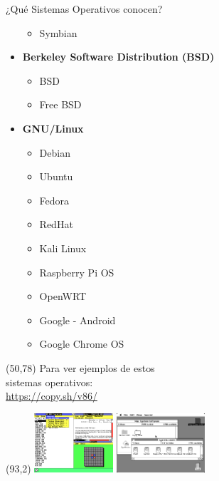 \documentclass[aspectratio=169]{beamer}
\begin{document}
\begin{frame}{¿Qué Sistemas Operativos conocen?}
\begin{textblock}{80}
\begin{itemize}
        \begin{itemize} \scriptsize 
            \item Symbian
        \end{itemize}
        \item[] \textbf{Berkeley Software Distribution (BSD)}
        \begin{itemize} \scriptsize 
            \item BSD
            \item Free BSD
        \end{itemize}
        \item[] \textbf{GNU/Linux}
        \begin{itemize} \scriptsize 
            \item Debian
            \item Ubuntu
            \item Fedora
            \item RedHat
            \item Kali Linux
            \item Raspberry Pi OS
            \item OpenWRT
            \item Google - Android 
            \item Google Chrome OS
        \end{itemize}
        \end{itemize}
    \end{textblock}
    \begin{textblock}{80}(50,78)
    \scriptsize
    Para ver ejemplos de estos\\
    sistemas operativos:\\
    \url{https://copy.sh/v86/}
    \end{textblock}
    \begin{textblock}{80}(93,2)  
    \includegraphics[height=2.2cm]{img/Microsoft_Windows_1.0_1985.png} \hspace{0.1cm}
    \includegraphics[height=2.2cm]{img/Apple_Macintosh_Desktop_1990.png} 

\end{textblock}
\end{frame}
\end{document}
